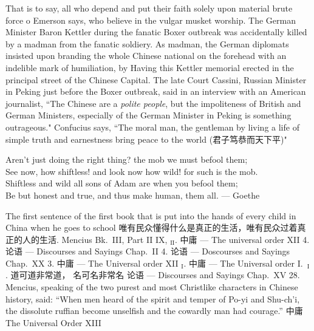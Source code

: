 \begin{thebibliography}{30}
     That is to say, all who depend and put their faith solely upon material brute force o Emerson says, who believe in the vulgar musket worship.
     The German Minister Baron Kettler during the fanatic Boxer outbreak was accidentally killed by a madman from the fanatic soldiery. As madman, the German diplomats insisted upon branding the whole Chinese national on the forehead with an indelible mark of humiliation, by Having this Kettler memorial erected in the principal street of the Chinese Capital. The late Court Cassini, Russian Minister in Peking just before the Boxer outbreak, said in an interview with an American journalist, ``The Chinese are a \emph{polite people}, but the impoliteness of British and German Ministers, especially of the German Minister in Peking is something outrageous."
     Confucius says, ``The moral man, the gentleman by living a life of simple truth and earnestness bring peace to the world (君子笃恭而天下平)" 
     \begin{center}
    Aren't just doing the right thing? \hfill the mob we must befool them;\\
    See now, how shiftless! and look now how wild! for such is the mob.\\
    Shiftless and wild all sons of Adam are when you befool them;\\
    Be but honest and true, and thus make human, them all. \hfill --- Goethe\\
\end{center} 
     The first sentence of the first book that is put into the hands of every child in China when he goes to school
     唯有民众懂得什么是真正的生活，唯有民众过着真正的人的生活.
     Mencius Bk.~III, Part II IX, $_{\text{II}}$.
     中庸 --- The universal order XII 4.
     论语 --- Discourses and Sayings Chap.~II 4.
     论语 --- Doscourses and Sayings Chap.~XX 3.
     中庸 --- The Universal order XII $_{\text{I}}$.
     中庸 --- The Universal order I.~$_\text{I}$.
     道可道非常道， 名可名非常名
     论语 --- Discourses and Sayings Chap.~XV 28.
     Mencius, speaking of the two purest and most Christlike characters in Chinese history, said: ``When men heard of the spirit and temper of Po-yi and Shu-ch'i, the dissolute ruffian become unselfish and the cowardly man had courage.''
     中庸 The Universal Order XIII

\end{thebibliography}
